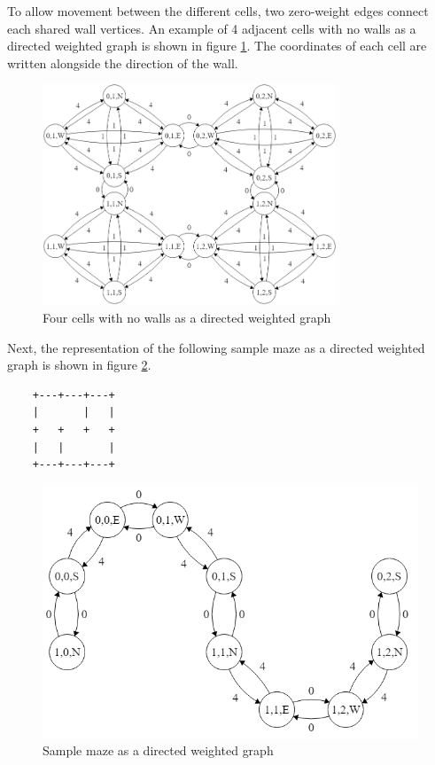 \documentclass[12pt]{article}
\begin{document}
To allow movement between the different \gls{cell}s, two zero-weight edges connect each shared wall vertices.
An example of 4 adjacent \gls{cell}s with no walls as a directed weighted \gls{graph} is shown in figure \ref{No walls maze as a directed weighted graph figure}. The coordinates of each \gls{cell} are written alongside the direction of the wall.

\begin{figure}[H]
\centering
\includegraphics[width=0.78\textwidth]{images/four_cell_graph_with_weights.png}
\caption{Four \gls{cell}s with no walls as a directed weighted \gls{graph}}
\label{No walls maze as a directed weighted graph figure}
\end{figure}

Next, the representation of the following sample \gls{maze} as a directed weighted graph is shown in figure \ref{Sample maze as a directed weighted graph figure}.
\lstset{
  xleftmargin=\simpleMazeMargin,
  xrightmargin=\simpleMazeMargin
}
\begin{lstlisting}
    +---+---+---+
    |       |   |
    +   +   +   +
    |   |       |
    +---+---+---+
\end{lstlisting}

\begin{figure}[H]
\centering
\includegraphics[width=\textwidth]{images/sample_maze_graph.png}
\caption{Sample maze as a directed weighted \gls{graph}}
\label{Sample maze as a directed weighted graph figure}
\end{figure}
\end{document}
